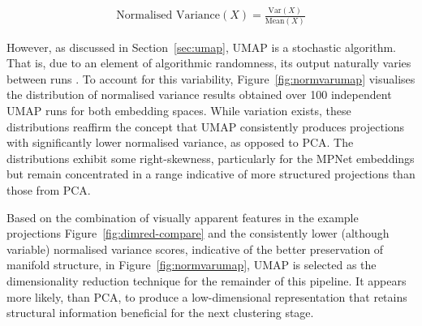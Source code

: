 \documentclass[10pt,oneside]{report}
\begin{document}
\begin{align}
    \text{Normalised Variance}(X) = \frac{\text{Var}(X)}{\text{Mean}(X)}
    \label{eq:normvar}
\end{align}

However, as discussed in Section~\ref{sec:umap}, UMAP is a stochastic algorithm. That is, due to an element of algorithmic randomness, its output naturally varies between runs \cite{mcinnes2018umap}. To account for this variability, Figure~\ref{fig:normvarumap} visualises the distribution of normalised variance results obtained over 100 independent UMAP runs for both embedding spaces. While variation exists, these distributions reaffirm the concept that UMAP consistently produces projections with significantly lower normalised variance, as opposed to PCA. The distributions exhibit some right-skewness, particularly for the MPNet embeddings but remain concentrated in a range indicative of more structured projections than those from PCA.

Based on the combination of visually apparent features in the example projections Figure~\ref{fig:dimred-compare} and the consistently lower (although variable) normalised variance scores, indicative of the better preservation of manifold structure, in Figure~\ref{fig:normvarumap}, UMAP is selected as the dimensionality reduction technique for the remainder of this pipeline. It appears more likely, than PCA, to produce a low-dimensional representation that retains structural information beneficial for the next clustering stage. 
\end{document}

